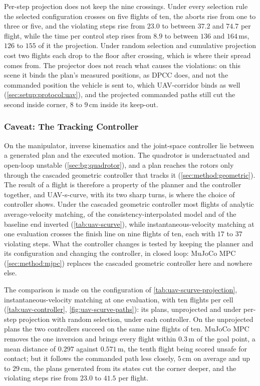 Per-step projection does not keep the nine crossings. Under every selection rule the selected configuration
crosses on five flights of ten, the aborts rise from one to three or five, and the violating steps rise from
$23.0$ to between $37.2$ and $74.7$ per flight, while the time per control step rises from $8.9$ to between
$136$ and $164$\,ms, $126$ to $155$ of it the projection. Under random selection and cumulative projection cost
two flights each drop to the floor after crossing, which is where their spread comes from. The projector
does not reach what causes the violations: on this scene it binds the plan's measured positions, as \ac{DPCC}
does, and not the commanded position the vehicle is sent to, which UAV-corridor binds as well
(\autoref{sec:setup:protocol:uav}), and the projected commanded paths still cut the second inside corner,
$8$ to $9$\,cm inside its keep-out.

\subsubsection{Caveat: The Tracking Controller}\label{sec:res:uav:controller}

On the manipulator, inverse kinematics and the joint-space controller lie between a generated plan and
the executed motion. The quadrotor is underactuated and open-loop unstable
(\autoref{sec:bg:quadrotor}), and a plan reaches the rotors only through the cascaded geometric
controller that tracks it (\autoref{sec:method:geometric}). The result of a flight is therefore a
property of the planner and the controller together, and UAV-s-curve, with its two sharp turns, is where
the choice of controller shows. Under the cascaded geometric controller most flights of analytic
average-velocity matching, of the consistency-interpolated model and of the baseline end inverted
(\autoref{tab:uav-scurve}), while instantaneous-velocity matching at one evaluation crosses the finish line
on nine flights of ten, each with $17$ to $37$ violating steps. What the controller changes is tested by
keeping the planner and its configuration and changing the controller, in closed loop: MuJoCo MPC (\autoref{sec:method:mjpc}) replaces the cascaded
geometric controller here and nowhere else.

The comparison is made on the configuration of \autoref{tab:uav-scurve-projection}, instantaneous-velocity
matching at one evaluation, with ten flights per cell (\autoref{tab:uav-controller},
\autoref{fig:uav-scurve-paths}): its plans, unprojected and under per-step projection with random selection,
under each controller. On the unprojected plans the two controllers succeed on the same nine flights of ten.
MuJoCo MPC removes the one inversion and brings every flight within $0.3$\,m of the goal point, a mean distance
of $0.297$ against $0.571$\,m, the tenth flight being scored unsafe for contact; but it follows the commanded
path less closely, $5$\,cm on average and up to $29$\,cm, the plans generated from its states cut the corner
deeper, and the violating steps rise from $23.0$ to $41.5$ per flight.

